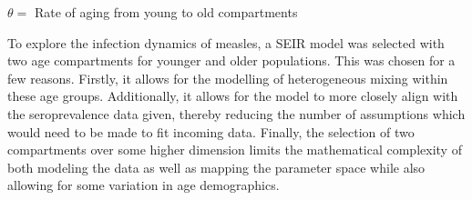 \documentclass[../Paper.tex]{subfiles}
\begin{document}
 $\theta = $ Rate of aging from young to old compartments \par
\par
\raggedright
To explore the infection dynamics of measles, a SEIR model was selected with two
age compartments for younger and older populations. This was chosen for a few
reasons. Firstly, it allows for the modelling of heterogeneous mixing within
these age groups. Additionally, it allows for the model to more closely
align with the seroprevalence data given, thereby reducing the number of assumptions
which would need to be made to fit incoming data. Finally, the selection of two
compartments over some higher dimension limits the mathematical complexity of both
modeling the data as well as mapping the parameter space while also allowing
for some variation in age demographics.

\clearpage
\end{document}
